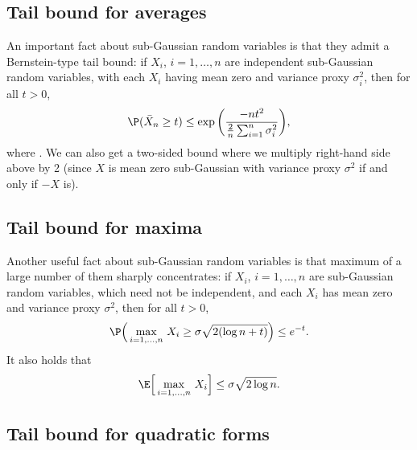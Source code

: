 \documentclass{article}
\begin{document}
\subsection{Tail bound for averages}

An important fact about sub-Gaussian random variables is that they admit a 
Bernstein-type tail bound: if $X_i$, $i=1,\dots,n$ are independent sub-Gaussian
random variables, with each $X_i$ having mean zero and variance proxy
$\sigma_i^2$, then for all $t>0$,    
\begin{equation}
\label{eq:sg_average}
\P(\bar{X}_n \geq t) \leq \exp \bigg( \frac{-nt^2}{
    \frac{2}{n}\sum_{i=1}^n \sigma_i^2} \bigg),
\end{equation}
where . We can also get a
two-sided bound where we multiply right-hand side above by 2 (since $X$ is mean
zero sub-Gaussian with variance proxy $\sigma^2$ if and only if $-X$ is).    

\subsection{Tail bound for maxima}

Another useful fact about sub-Gaussian random variables is that maximum of a
large number of them sharply concentrates: if $X_i$, $i=1,\dots,n$ are sub-Gaussian
random variables, which need not be independent, and each $X_i$ has mean zero
and variance proxy $\sigma^2$, then for all $t>0$,    
\begin{equation}
\label{eq:sg_max_prob}
\P \Big(\max_{i=1,\dots,n} \, X_i \geq \sigma \sqrt{2 (\log n + t)} \Big) \leq
e^{-t}.  
\end{equation}
It also holds that 
\begin{equation}
\label{eq:sg_max_exp}
\E \Big[ \max_{i=1,\dots,n} \, X_i \Big] \leq \sigma \sqrt{2 \log n}.
\end{equation}

\subsection{Tail bound for quadratic forms}
\end{document}

